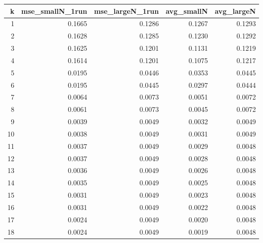\begin{tabular}{rrrrr}
\toprule
k & mse_smallN_1run & mse_largeN_1run & avg_smallN & avg_largeN \\
\midrule
1 & 0.1665 & 0.1286 & 0.1267 & 0.1293 \\
2 & 0.1628 & 0.1285 & 0.1230 & 0.1292 \\
3 & 0.1625 & 0.1201 & 0.1131 & 0.1219 \\
4 & 0.1614 & 0.1201 & 0.1075 & 0.1217 \\
5 & 0.0195 & 0.0446 & 0.0353 & 0.0445 \\
6 & 0.0195 & 0.0445 & 0.0297 & 0.0444 \\
7 & 0.0064 & 0.0073 & 0.0051 & 0.0072 \\
8 & 0.0061 & 0.0073 & 0.0045 & 0.0072 \\
9 & 0.0039 & 0.0049 & 0.0032 & 0.0049 \\
10 & 0.0038 & 0.0049 & 0.0031 & 0.0049 \\
11 & 0.0037 & 0.0049 & 0.0029 & 0.0048 \\
12 & 0.0037 & 0.0049 & 0.0028 & 0.0048 \\
13 & 0.0036 & 0.0049 & 0.0026 & 0.0048 \\
14 & 0.0035 & 0.0049 & 0.0025 & 0.0048 \\
15 & 0.0031 & 0.0049 & 0.0023 & 0.0048 \\
16 & 0.0031 & 0.0049 & 0.0022 & 0.0048 \\
17 & 0.0024 & 0.0049 & 0.0020 & 0.0048 \\
18 & 0.0024 & 0.0049 & 0.0019 & 0.0048 \\
\bottomrule
\end{tabular}
